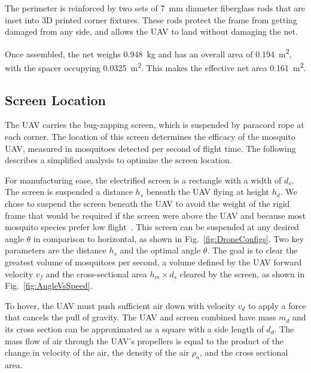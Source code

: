 The perimeter is reinforced by two sets of \SI{7}{\milli\metre} diameter fiberglass rods that are inset into 3D printed corner fixtures.
These rods protect the frame from getting damaged from any side, and allows the UAV to land without damaging the net.


Once assembled, the net weighs \SI{0.948}{\kilogram} and has an overall area of \SI{0.194}{\square\metre}, with the spacer occupying \SI{0.0325}{\square\metre}. 
This makes the effective net area \SI{0.161}{\square\metre}. %





\subsection{Screen Location}
The UAV carries the bug-zapping screen, which is suspended by paracord rope at each corner.  The location of this screen determines the efficacy of the mosquito UAV, measured in mosquitoes detected per second of flight time. The following describes a simplified analysis to optimize the screen location.

For manufacturing ease, the electrified screen is a rectangle with a width of $d_s$. The screen is suspended a distance $h_s$ beneath the UAV flying at height $h_d$.  We chose to suspend the screen beneath the UAV to avoid the weight of the rigid frame that would be required if the screen were above the UAV and because most mosquito species prefer low flight~\cite{gillies1976vertical}.  This screen can be suspended at any desired angle $\theta$ in comparison to horizontal, as shown in Fig.~\ref{fig:DroneConfigs}.
Two key parameters are the distance $h_s$ and the optimal angle $\theta$.  The goal is to clear the greatest volume of mosquitoes per second, a volume defined by the UAV forward velocity $v_f$ and the cross-sectional area $h_m \times d_s$ cleared by the screen, as shown in Fig.~\ref{fig:AngleVsSpeed}.

To hover, the UAV must push sufficient air down with velocity $v_d$ to apply a force that cancels the pull of gravity.  The UAV and screen combined have mass $m_{d}$ and its cross section can be approximated as a square with a side length of $d_d$.  The mass flow of air through the UAV's propellers is equal to the product of the change in velocity of the air, the density of the air $\rho_a$, and the cross sectional area.

